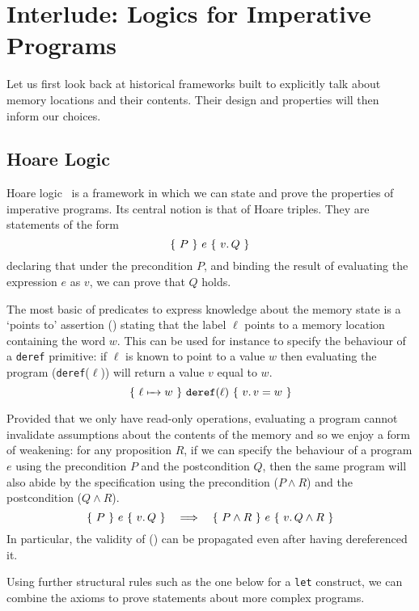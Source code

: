 \section{Interlude: Logics for Imperative Programs}

Let us first look back at historical frameworks built to explicitly
talk about memory locations and their contents.
%
Their design and properties will then inform our choices.

\subsection{Hoare Logic}

Hoare logic~\citeyearpar{DBLP:journals/cacm/Hoare69}  is a framework in
which we can state and prove the properties of imperative programs.
%
Its central notion is that of Hoare triples. They are statements of
the form
\[ \lbrace~ P ~\rbrace~ e ~\lbrace~ v.\, Q ~\rbrace \]
declaring that under the precondition
$P$, and binding the result of evaluating the expression $e$ as $v$,
we can prove that $Q$ holds.

The most basic of predicates to express knowledge about the memory
state is a `points to' assertion () stating that
the label $\ell$ points to a memory location containing the word $w$.
%
\label{sec:deref}
This can be used for instance to specify the behaviour of a \texttt{deref}
primitive: if $\ell$ is known to point to a value $w$ then evaluating
the program (\texttt{deref}($\ell$)) will return a value $v$ equal to $w$.
\[ \lbrace~ \ell \xmapsto{~~} w ~\rbrace~ \texttt{deref}(\ell) ~\lbrace~ v.\, v = w ~\rbrace \]

Provided that we only have read-only operations, evaluating a program cannot
invalidate assumptions about the contents of the memory and so we enjoy a
form of weakening: for any proposition $R$, if we can specify the behaviour
of a program $e$ using the precondition $P$ and the postcondition $Q$,
then the same program will also abide by the specification using the
precondition ($P \wedge R$) and the postcondition ($Q \wedge R$).
\[ \lbrace~ P ~\rbrace~ e ~\lbrace~ v.\, Q ~\rbrace \quad \Longrightarrow \quad \lbrace~ P \wedge R ~\rbrace~ e ~\lbrace~ v.\, Q \wedge R ~\rbrace \]
In particular, the validity of () can be propagated even
after having dereferenced it.

Using further structural rules such as the one below for a
\texttt{let} construct, we can combine the axioms to prove
statements about more complex programs.

\newcommand{\letin}[3]{\texttt{let}\,#1\,=\,#2~\texttt{in}~#3}

